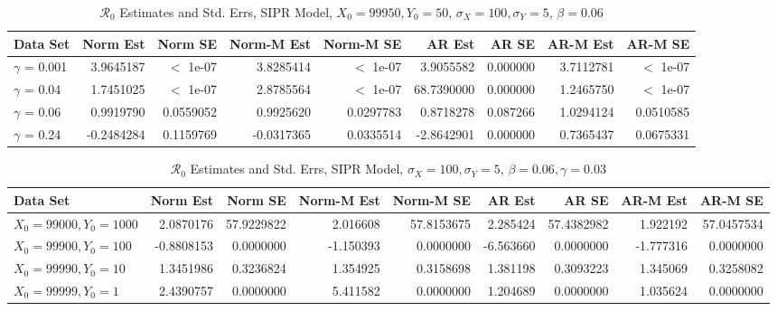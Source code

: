 \documentclass[12pt]{article}
\newcommand{\rr}{\ensuremath{\mathcal{R}_0}}
\begin{document}
\begin{table}[H]
	
	\caption{\label{tab:}$\rr$ Estimates and Std. Errs, SIPR Model,
		$X_0 = 99950, Y_0 = 50$, $\sigma_X = 100, \sigma_Y = 5$, $\beta = 0.06$}
	\centering
	\begin{footnotesize}
		\begin{tabular}[t]{l|r|r|r|r|r|r|r|r}
			\hline
			Data Set & Norm Est & Norm SE & Norm-M Est & Norm-M SE & AR Est & AR SE & AR-M Est & AR-M SE\\
			\hline
			$\gamma$ = 0.001 & 3.9645187 & $<$ 1e-07 & 3.8285414 & $<$ 1e-07 & 3.9055582 & 0.000000 & 3.7112781 & $<$ 1e-07 \\
			\hline
			$\gamma$ = 0.04 & 1.7451025 & $<$ 1e-07 & 2.8785564 & $<$ 1e-07 & 68.7390000 & 0.000000 & 1.2465750 & $<$ 1e-07 \\
			\hline
			$\gamma$ = 0.06 & 0.9919790 & 0.0559052 & 0.9925620 & 0.0297783 & 0.8718278 & 0.087266 & 1.0294124 & 0.0510585\\
			\hline
			$\gamma$ = 0.24 & -0.2484284 & 0.1159769 & -0.0317365 & 0.0335514 & -2.8642901 & 0.000000 & 0.7365437 & 0.0675331\\
			\hline
		\end{tabular}
	\end{footnotesize}
\end{table}

\begin{table}[H]
	
	\caption{\label{tab:}$\rr$ Estimates and Std. Errs, SIPR Model,
		$\sigma_X = 100, \sigma_Y = 5$, $\beta = 0.06, \gamma = 0.03$}
	\centering
	\begin{footnotesize}
		\begin{tabular}[t]{l|r|r|r|r|r|r|r|r}
			\hline
			Data Set & Norm Est & Norm SE & Norm-M Est & Norm-M SE & AR Est & AR SE & AR-M Est & AR-M SE\\
			\hline
			$X_0 = 99000, Y_0 = 1000$ & 2.0870176 & 57.9229822 & 2.016608 & 57.8153675 & 2.285424 & 57.4382982 & 1.922192 & 57.0457534\\
			\hline
			$X_0 = 99900, Y_0 = 100$ & -0.8808153 & 0.0000000 & -1.150393 & 0.0000000 & -6.563660 & 0.0000000 & -1.777316 & 0.0000000\\
			\hline
			$X_0 = 99990, Y_0 = 10$ & 1.3451986 & 0.3236824 & 1.354925 & 0.3158698 & 1.381198 & 0.3093223 & 1.345069 & 0.3258082\\
			\hline
			$X_0 = 99999, Y_0 = 1$ & 2.4390757 & 0.0000000 & 5.411582 & 0.0000000 & 1.204689 & 0.0000000 & 1.035624 & 0.0000000\\
			\hline
		\end{tabular}
	\end{footnotesize}
\end{table}
\end{document}

